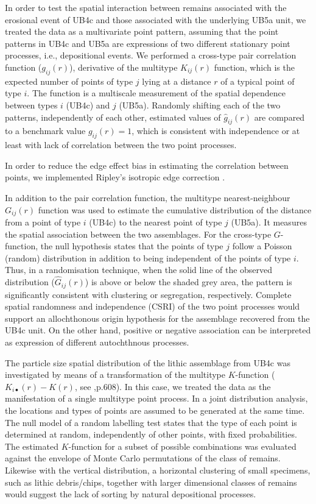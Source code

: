 \documentclass[preprint,authoryear,times]{elsarticle} %
\begin{document}
In order to test the spatial interaction between remains associated with the erosional event of UB4c and those associated with the underlying UB5a unit, we treated the data as a multivariate point pattern, assuming that the point patterns in UB4c and UB5a are expressions of two different stationary point processes, i.e., depositional events. We performed a cross-type pair correlation function ($g_{ij}(r)$), derivative of the multitype $K_{ij}(r)$ function, which is the expected number of points of type $j$ lying at a distance $r$ of a typical point of type $i$. The function is a multiscale measurement of the spatial dependence between types $i$ (UB4c) and $j$ (UB5a). Randomly shifting each of the two patterns, independently of each other, estimated values of $\hat{g}_{ij}(r)$ are compared to a benchmark value $g_{ij}(r)=1$, which is consistent with independence or at least with lack of correlation between the two point processes.

In order to reduce the edge effect bias in estimating the correlation between points, we implemented Ripley's isotropic edge correction \citep{Ohser1983,Ripley1988}. 

In addition to the pair correlation function, the multitype nearest-neighbour $G_{ij}(r)$ function was used to estimate the cumulative distribution of the distance from a point of type $i$ (UB4c) to the nearest point of type $j$ (UB5a). It measures the spatial association between the two assemblages. For the cross-type $G$-function, the null hypothesis states that the points of type $j$ follow a Poisson (random) distribution in addition to being independent of the points of type $i$. Thus, in a randomisation technique, when the solid line of the observed distribution ($\hat{G}_{ij}(r)$) is above or below the shaded grey area, the pattern is significantly consistent with clustering or segregation, respectively. Complete spatial randomness and independence (CSRI) of the two point processes would support an allochthonous origin hypothesis for the assemblage recovered from the UB4c unit. On the other hand, positive or negative association can be interpreted as expression of different autochthnous processes.

The particle size spatial distribution of the lithic assemblage from UB4c was investigated by means of a transformation of the multitype $K$-function ($K_{i\bullet}(r)-K(r)$, see \cite{spatstatBook},p.608). In this case, we treated the data as the manifestation of a single multitype point process. In a joint distribution analysis, the locations and types of points are assumed to be generated at the same time. The null model of a random labelling test states that the type of each point is determined at random, independently of other points, with fixed probabilities. The estimated $K$-function for a subset of possible combinations was evaluated against the envelope of Monte Carlo permutations of the class of remains. Likewise with the vertical distribution, a horizontal clustering of small specimens, such as lithic debris/chips, together with larger dimensional classes of remains would suggest the lack of sorting by natural depositional processes. %
\end{document}
